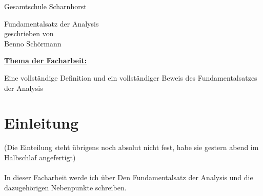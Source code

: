 \documentclass[fontsize=12pt,paper=a4,DIV12,cleardoublepage=empty, 
liststotoc,idxtotoc,bibtotoc]{article}
\theoremstyle{plain}
\theoremstyle{definition}
\begin{document}
	\begin{titlepage}
		\vspace*{-3cm}
		\noindent
		\hspace*{1cm}
			\begin{center}
				\centering
				{\LARGE Gesamtschule Scharnhorst}
			\end{center}
		\begin{center}
		\Large{Fundamentalsatz der Analysis}\\[0.5cm]
		\normalsize{geschrieben von}\\[0.25cm]	
		\large{Benno Schörmann}\\[0.5cm]
		\end{center}
	\begin{flushleft}
	\hyperref[subsec:thema1]{\textbf{\large Thema der Facharbeit:}}  \\
	\end{flushleft}
	Eine vollständige Definition und ein vollständiger Beweis des Fundamentalsatzes der Analysis
	\quad \\[1.5cm]
	\noindent 
	\renewcommand{\arraystretch}{1.4}
	\end{titlepage}
	\newpage
	\thispagestyle{empty}
	\tableofcontents
	\newpage
	\section{Einleitung}
	(Die Einteilung steht übrigens noch absolut nicht fest, habe sie gestern abend im Halbschlaf angefertigt) \\\\
	In dieser Facharbeit werde ich über Den Fundamentalsatz der Analysis und die dazugehörigen Nebenpunkte schreiben.
	
	
	
\end{document}
